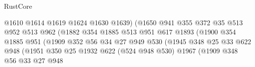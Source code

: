 \begin{lexlean}{RustCore}
\begin{coremodule}
                                        @1610
                                        @1614
                                        @1619
                                        @1624
                                        @1630
                                        @1639)
                                      (@1650
                                        @941
                                        @355
                                        @372
                                        @35
                                        @513
                                        @952
                                        @513
                                        @962
                                        (@1882
                                          @354
                                          @1885
                                          @513
                                          @951
                                          @617
                                          @1893
                                          (@1900
                                            @354
                                            @1885
                                            @951
                                            (@1909
                                              @352
                                              @56
                                              @34
                                              @27
                                              @949
                                              @530
                                              (@1945
                                                @348
                                                @25
                                                @33
                                                @622
                                                @948
                                                (@1951
                                                  @350
                                                  @25
                                                  @1932
                                                  @622
                                                  (@524 @948 @530)
                                                  @1967
                                                  (@1909
                                                    @348
                                                    @56
                                                    @33
                                                    @27
                                                    @948

\end{coremodule}
\end{lexlean}
